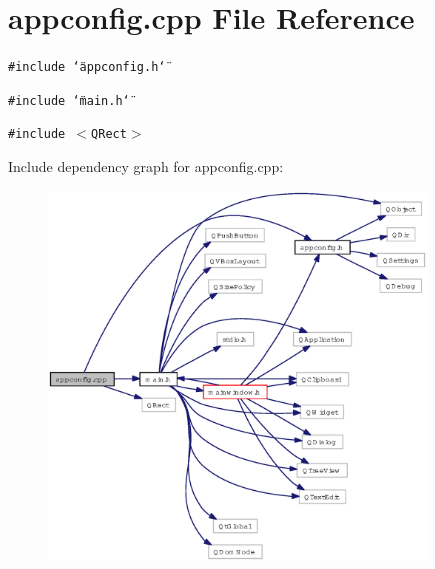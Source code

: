 \section{appconfig.cpp File Reference}
\label{appconfig_8cpp}
{\tt \#include \char`\"{}appconfig.h\char`\"{}}\par
{\tt \#include \char`\"{}main.h\char`\"{}}\par
{\tt \#include $<$QRect$>$}\par


Include dependency graph for appconfig.cpp:\begin{figure}[H]
\begin{center}
\leavevmode
\includegraphics[width=284pt]{appconfig_8cpp__incl}
\end{center}
\end{figure}
